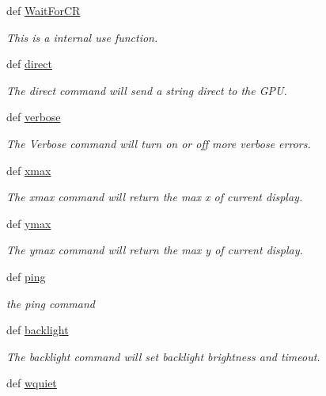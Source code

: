 \begin{DoxyCompactItemize}
\item 
def \hyperlink{namespacemodule_1_1ez_l_c_d3xx_a9c709d105cdc1e75f3b59214ba0f65d8}{Wait\-For\-C\-R}
\begin{DoxyCompactList}\small\item\em This is a internal use function. \end{DoxyCompactList}\item 
def \hyperlink{group___general_gaae4c9fde1cb31e9eeb914f81698c6c92}{direct}
\begin{DoxyCompactList}\small\item\em The direct command will send a string direct to the G\-P\-U. \end{DoxyCompactList}\item 
def \hyperlink{group___general_ga350c2e1be0d3d074d79d7a7278c44a22}{verbose}
\begin{DoxyCompactList}\small\item\em The Verbose command will turn on or off more verbose errors. \end{DoxyCompactList}\item 
def \hyperlink{group___general_ga594f839f4d44b15ece850c795ec8e7ba}{xmax}
\begin{DoxyCompactList}\small\item\em The xmax command will return the max x of current display. \end{DoxyCompactList}\item 
def \hyperlink{group___general_gae8e395513eeb5519612f3e988a059106}{ymax}
\begin{DoxyCompactList}\small\item\em The ymax command will return the max y of current display. \end{DoxyCompactList}\item 
def \hyperlink{group___general_ga123be6aba6fc316922b71e3fe1bc7aaf}{ping}
\begin{DoxyCompactList}\small\item\em the ping command \end{DoxyCompactList}\item 
def \hyperlink{group___general_ga8b73d9d966ac29c172e81aac05bf9bf9}{backlight}
\begin{DoxyCompactList}\small\item\em The backlight command will set backlight brightness and timeout. \end{DoxyCompactList}\item 
def \hyperlink{group___general_gae760b8839f85e30c2a294a593e77b9d7}{wquiet}

\end{DoxyCompactItemize}
